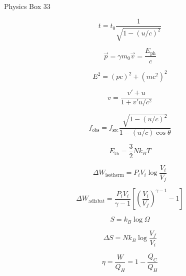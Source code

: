 \documentclass[fleqn]{article}[12pt]
\begin{document}
    Physics Box 33

    \begin{equation}
        t = t_0 \frac{1}{\sqrt{1-(u/c)^2}}
    \end{equation}

    \begin{equation}
        \vec{p} = \gamma m_0 \vec{v} = \frac{E_{\text{ph}}}{c}
    \end{equation}

    \begin{equation}
        E^2 = (pc)^2 + (mc^2)^2
    \end{equation}

    \begin{equation}
        v = \frac{v'+u}{1+v'u/c^2}
    \end{equation}

    \begin{equation}
        f_{\text{obs}} = f_{\text{src}} \frac{\sqrt{1-(u/c)^2}}{1-(u/c)\cos\theta}
    \end{equation}

    \begin{equation}
        E_{\text{th}} = \frac{3}{2}Nk_B T
    \end{equation}

    \begin{equation}
        \Delta W_{\text{isotherm}} = P_iV_i\log \frac{V_i}{V_f}
    \end{equation}

    \begin{equation}
        \Delta W_{\text{adiabat}} = \frac{P_iV_i}{\gamma-1} \left[\left(\frac{V_i}{V_f}\right)^{\gamma-1}-1\right]
    \end{equation}

    \begin{equation}
        S = k_B \log \Omega
    \end{equation}

    \begin{equation}
        \Delta S = N k_B \log \frac{V_f}{V_i}
    \end{equation}

    \begin{equation}
        \eta = \frac{W}{Q_H} = 1-\frac{Q_C}{Q_H}
    \end{equation}
\end{document}
